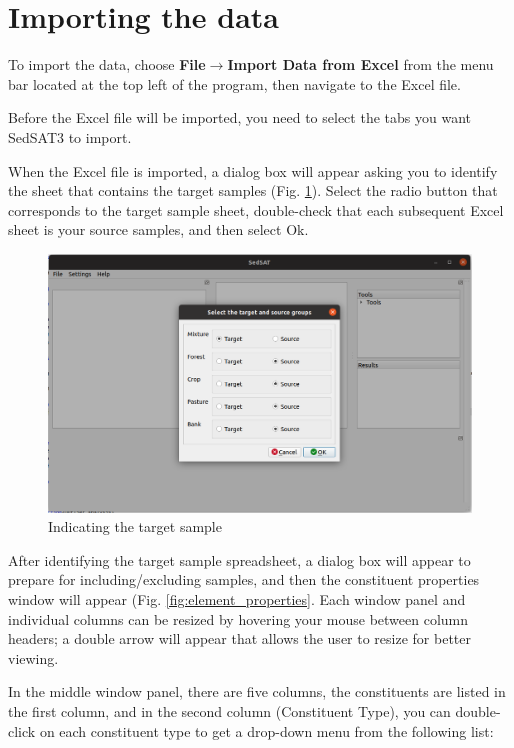 \documentclass[12pt]{report}
\begin{document}
\section{Importing the data}\label{sec:importing_data}
To import the data, choose \textbf{File}$\rightarrow$\textbf{Import Data from Excel} from the menu bar located at the top left of the program, then navigate  to  the Excel file. 

Before the Excel file will be imported, you need to select the tabs you want SedSAT3 to import. 

When the Excel file is imported, a dialog box will appear asking you to identify the sheet that contains the target samples (Fig. \ref{fig:indicate_target_sample}). Select the radio button that corresponds to the target sample sheet, double-check that each subsequent Excel sheet is your source samples, and then select Ok. 

\begin{figure}[ht]\label{fig:indicate_target_sample}
    \centering
    \includegraphics[width=14cm]{Figures/SelectSourceTargetGroups.png}
    \caption{Indicating the target sample}
    
\end{figure}


After identifying the target sample spreadsheet, a dialog box will appear to prepare for including/excluding samples, and then the constituent properties window will appear (Fig. \ref{fig:element_properties}.  Each window panel and individual columns can be resized by hovering your mouse between column headers; a double arrow will appear that allows the user to resize for better viewing.   

In the middle  window panel, there are five columns, the constituents are listed in the first column, and in the second column (Constituent Type), you can double-click on each constituent type to get a drop-down menu from the following list:
\end{document}
